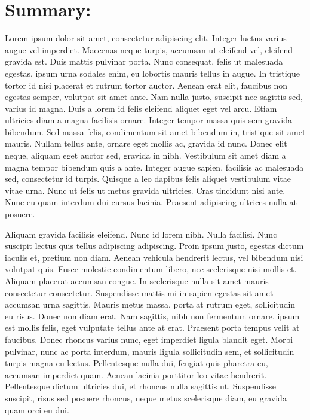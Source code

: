 %
%

\section*{Summary:}

Lorem ipsum dolor sit amet, consectetur adipiscing elit. Integer luctus varius augue vel imperdiet. Maecenas neque turpis, accumsan ut eleifend vel, eleifend gravida est. Duis mattis pulvinar porta. Nunc consequat, felis ut malesuada egestas, ipsum urna sodales enim, eu lobortis mauris tellus in augue. In tristique tortor id nisi placerat et rutrum tortor auctor. Aenean erat elit, faucibus non egestas semper, volutpat sit amet ante. Nam nulla justo, suscipit nec sagittis sed, varius id magna. Duis a lorem id felis eleifend aliquet eget vel arcu. Etiam ultricies diam a magna facilisis ornare. Integer tempor massa quis sem gravida bibendum. Sed massa felis, condimentum sit amet bibendum in, tristique sit amet mauris. Nullam tellus ante, ornare eget mollis ac, gravida id nunc. Donec elit neque, aliquam eget auctor sed, gravida in nibh. Vestibulum sit amet diam a magna tempor bibendum quis a ante. Integer augue sapien, facilisis ac malesuada sed, consectetur id turpis. Quisque a leo dapibus felis aliquet vestibulum vitae vitae urna. Nunc ut felis ut metus gravida ultricies. Cras tincidunt nisi ante. Nunc eu quam interdum dui cursus lacinia. Praesent adipiscing ultrices nulla at posuere.

Aliquam gravida facilisis eleifend. Nunc id lorem nibh. Nulla facilisi. Nunc suscipit lectus quis tellus adipiscing adipiscing. Proin ipsum justo, egestas dictum iaculis et, pretium non diam. Aenean vehicula hendrerit lectus, vel bibendum nisi volutpat quis. Fusce molestie condimentum libero, nec scelerisque nisi mollis et. Aliquam placerat accumsan congue. In scelerisque nulla sit amet mauris consectetur consectetur. Suspendisse mattis mi in sapien egestas sit amet accumsan urna sagittis. Mauris metus massa, porta at rutrum eget, sollicitudin eu risus. Donec non diam erat. Nam sagittis, nibh non fermentum ornare, ipsum est mollis felis, eget vulputate tellus ante at erat. Praesent porta tempus velit at faucibus. Donec rhoncus varius nunc, eget imperdiet ligula blandit eget. Morbi pulvinar, nunc ac porta interdum, mauris ligula sollicitudin sem, et sollicitudin turpis magna eu lectus. Pellentesque nulla dui, feugiat quis pharetra eu, accumsan imperdiet quam. Aenean lacinia porttitor leo vitae hendrerit. Pellentesque dictum ultricies dui, et rhoncus nulla sagittis ut. Suspendisse suscipit, risus sed posuere rhoncus, neque metus scelerisque diam, eu gravida quam orci eu dui.

